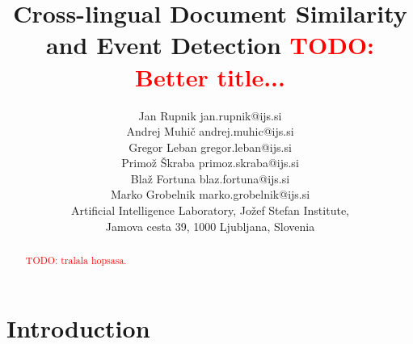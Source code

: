 \documentclass[twoside,11pt]{article}
\newcommand{\todo}[1]{\textcolor{red}{TODO: #1}}
\begin{document}
\title{Cross-lingual Document Similarity and Event Detection \todo{Better title...}}

\author{\name Jan Rupnik \email jan.rupnik@ijs.si \\
       \name Andrej Muhi\v{c} \email andrej.muhic@ijs.si \\
       \name Gregor Leban \email gregor.leban@ijs.si \\
       \name Primo\v{z} \v{S}kraba \email primoz.skraba@ijs.si \\
       \name Bla\v{z} Fortuna \email blaz.fortuna@ijs.si \\
       \name Marko Grobelnik \email marko.grobelnik@ijs.si \\
       \addr Artificial Intelligence Laboratory, Jo\v{z}ef Stefan Institute,\\
       Jamova cesta 39, 1000 Ljubljana, Slovenia}

\maketitle

\begin{abstract}
\todo{tralala hopsasa.}
\end{abstract}

\section{Introduction}
\end{document}

